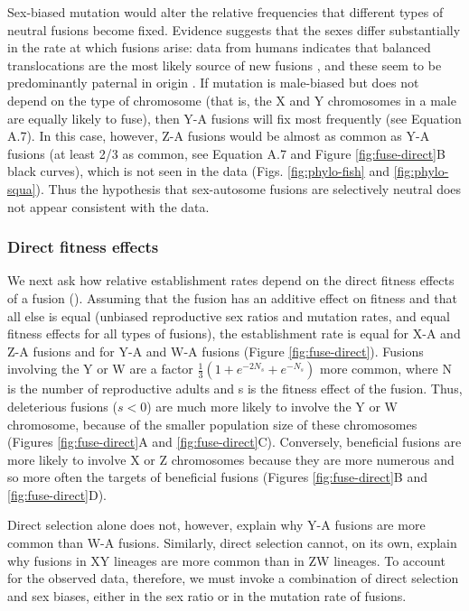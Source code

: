 Sex-biased mutation would alter the relative frequencies that different types of neutral fusions become fixed. Evidence suggests that the sexes differ substantially in the rate at which fusions arise: data from humans indicates that balanced translocations are the most likely source of new fusions \citep{Schubert2011}, and these seem to be predominantly paternal in origin \citep{Batista1993, Sartorelli2001, Wyrobek2006, Thomas2010, Grossmann2010, Schubert2011}. If mutation is male-biased but does not depend on the type of chromosome (that is, the X and Y chromosomes in a male are equally likely to fuse), then Y-A fusions will fix most frequently (see Equation A.7). In this case, however, Z-A fusions would be almost as common as Y-A fusions (at least 2/3 as common, see Equation A.7 and Figure \ref{fig:fuse-direct}B black curves), which is not seen in the data (Figs. \ref{fig:phylo-fish} and \ref{fig:phylo-squa}). Thus the hypothesis that sex-autosome fusions are selectively neutral does not appear consistent with the data.

\subsubsection{Direct fitness effects}

We next ask how relative establishment rates depend on the direct fitness effects of a fusion (). Assuming that the fusion has an additive effect on fitness and that all else is equal (unbiased reproductive sex ratios and mutation rates, and equal fitness effects for all types of fusions), the establishment rate is equal for X-A and Z-A fusions and for Y-A and W-A fusions (Figure \ref{fig:fuse-direct}). Fusions involving the Y or W are a factor $\frac{\text{1}}{\text{3}}(\text{1} + e^{-\text{2}N_s} + e^{-N_s})$
more common, where N is the number of reproductive adults and s is the fitness effect of the fusion. Thus, deleterious fusions ($s<\text{0}$) are much more likely to involve the Y or W chromosome, because of the smaller population size of these chromosomes (Figures \ref{fig:fuse-direct}A and \ref{fig:fuse-direct}C). Conversely, beneficial fusions are more likely to involve X or Z chromosomes because they are more numerous and so more often the targets of beneficial fusions (Figures \ref{fig:fuse-direct}B and \ref{fig:fuse-direct}D). 

Direct selection alone does not, however, explain why Y-A fusions are more common than W-A fusions. Similarly, direct selection cannot, on its own, explain why fusions in XY lineages are more common than in ZW lineages. To account for the observed data, therefore, we must invoke a combination of direct selection and sex biases, either in the sex ratio or in the mutation rate of fusions. 

